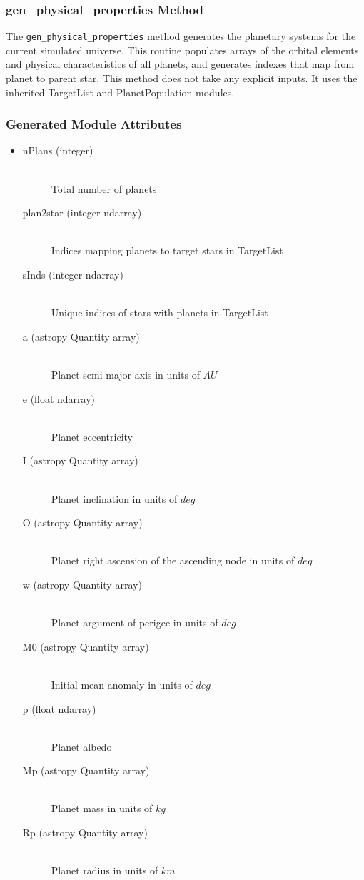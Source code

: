 \documentclass[cleanfoot]{asme2ej}
\begin{document}
\subsubsection{gen\_physical\_properties Method} \label{sec:genphysicalpropertiestask}
The \verb+gen_physical_properties+ method generates the planetary systems for the current simulated universe. This routine populates arrays of the orbital elements and physical characteristics of all planets, and generates indexes that map from planet to parent star. This method does not take any explicit inputs.  It uses the inherited TargetList and PlanetPopulation modules.

\subsubsection*{Generated Module Attributes}
\begin{itemize}
\item 
\begin{description}
    \item[nPlans (integer)] \hfill \\ Total number of planets
    \item[plan2star (integer ndarray)] \hfill \\ Indices mapping planets to target stars in TargetList
    \item[sInds (integer ndarray)] \hfill \\ Unique indices of stars with planets in TargetList
    \item[a (astropy Quantity array)] \hfill \\ Planet semi-major axis in units of $ AU $
    \item[e (float ndarray)] \hfill \\ Planet eccentricity
    \item[I (astropy Quantity array)] \hfill \\ Planet inclination in units of $ deg $
    \item[O (astropy Quantity array)] \hfill \\ Planet right ascension of the ascending node in units of $ deg $
    \item[w (astropy Quantity array)] \hfill \\ Planet argument of perigee in units of $ deg $
    \item[M0 (astropy Quantity array)] \hfill \\ Initial mean anomaly in units of $ deg $
    \item[p (float ndarray)] \hfill \\ Planet albedo
    \item[Mp (astropy Quantity array)] \hfill \\ Planet mass in units of $ kg $
    \item[Rp (astropy Quantity array)] \hfill \\ Planet radius in units of $ km $
\end{description}
\end{itemize}
\end{document}
